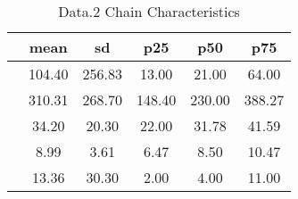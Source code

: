 \begin{table}[htbp]
\caption{\label{clabel} Data.2 Chain Characteristics}\centering\medskip
\begin{tabular}{lccccc} \hline \hline
 & mean  & sd  & p25  & p50  & p75  \\  \hline 
 &       104.40 &       256.83 &        13.00 &        21.00 &        64.00 \\  
 &       310.31 &       268.70 &       148.40 &       230.00 &       388.27 \\  
 &        34.20 &        20.30 &        22.00 &        31.78 &        41.59 \\  
 &         8.99 &         3.61 &         6.47 &         8.50 &        10.47 \\  
 &        13.36 &        30.30 &         2.00 &         4.00 &        11.00 \\  
\hline \hline \end{tabular}
\end{table}
